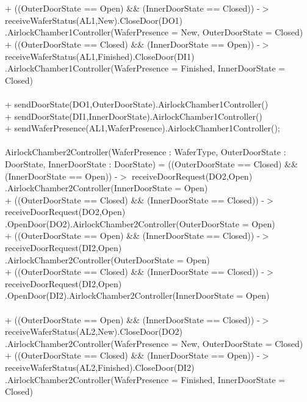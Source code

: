 \documentclass[a4paper,12pt]{article}
\begin{document}
	\\
	\\+ ((OuterDoorState == Open) \&\& (InnerDoorState == Closed)) -$>$ receiveWaferStatus(AL1,New).CloseDoor(DO1)
	\\.AirlockChamber1Controller(WaferPresence = New, OuterDoorState = Closed)
	\\+ ((OuterDoorState == Closed) \&\& (InnerDoorState == Open)) -$>$ receiveWaferStatus(AL1,Finished).CloseDoor(DI1)\\.AirlockChamber1Controller(WaferPresence = Finished, InnerDoorState = Closed)
	\\
	\\+ sendDoorState(DO1,OuterDoorState).AirlockChamber1Controller()
	\\+ sendDoorState(DI1,InnerDoorState).AirlockChamber1Controller()
	\\+ sendWaferPresence(AL1,WaferPresence).AirlockChamber1Controller();
	\\
	\\AirlockChamber2Controller(WaferPresence : WaferType, OuterDoorState : DoorState, InnerDoorState : DoorState) =
	((OuterDoorState == Closed) \&\& (InnerDoorState == Open)) -$>$ receiveDoorRequest(DO2,Open)
	\\.AirlockChamber2Controller(InnerDoorState = Open)
	\\+ ((OuterDoorState == Closed) \&\& (InnerDoorState == Closed)) -$>$ receiveDoorRequest(DO2,Open)
	\\.OpenDoor(DO2).AirlockChamber2Controller(OuterDoorState = Open)
	\\+ ((OuterDoorState == Open) \&\& (InnerDoorState == Closed)) -$>$ receiveDoorRequest(DI2,Open)
	\\.AirlockChamber2Controller(OuterDoorState = Open)
	\\+ ((OuterDoorState == Closed) \&\& (InnerDoorState == Closed)) -$>$ receiveDoorRequest(DI2,Open)
	\\.OpenDoor(DI2).AirlockChamber2Controller(InnerDoorState = Open)
	\\
	\\+ ((OuterDoorState == Open) \&\& (InnerDoorState == Closed)) -$>$ receiveWaferStatus(AL2,New).CloseDoor(DO2)
	\\.AirlockChamber2Controller(WaferPresence = New, OuterDoorState = Closed)
	\\+ ((OuterDoorState == Closed) \&\& (InnerDoorState == Open)) -$>$ receiveWaferStatus(AL2,Finished).CloseDoor(DI2)\\.AirlockChamber2Controller(WaferPresence = Finished, InnerDoorState = Closed)
\end{document}
